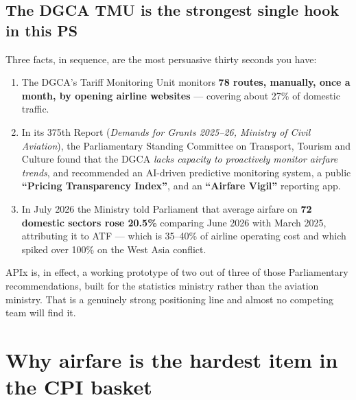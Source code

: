 \subsection{The DGCA TMU is the strongest single hook in this PS}

Three facts, in sequence, are the most persuasive thirty seconds you have:

\begin{enumerate}
\item The DGCA's Tariff Monitoring Unit monitors \textbf{78 routes, manually, once a
month, by opening airline websites} --- covering about 27\% of domestic traffic.
\item In its 375th Report (\emph{Demands for Grants 2025--26, Ministry of Civil
Aviation}), the Parliamentary Standing Committee on Transport, Tourism and Culture found
that the DGCA \emph{lacks capacity to proactively monitor airfare trends}, and recommended
an AI-driven predictive monitoring system, a public \textbf{``Pricing Transparency
Index''}, and an \textbf{``Airfare Vigil''} reporting app.
\item In July 2026 the Ministry told Parliament that average airfare on \textbf{72 domestic
sectors rose 20.5\%} comparing June 2026 with March 2025, attributing it to ATF --- which
is 35--40\% of airline operating cost and which spiked over 100\% on the West Asia
conflict.
\end{enumerate}

\noindent APIx is, in effect, a working prototype of two out of three of those
Parliamentary recommendations, built for the statistics ministry rather than the aviation
ministry. That is a genuinely strong positioning line and almost no competing team will
find it.

\section{Why airfare is the hardest item in the CPI basket}

